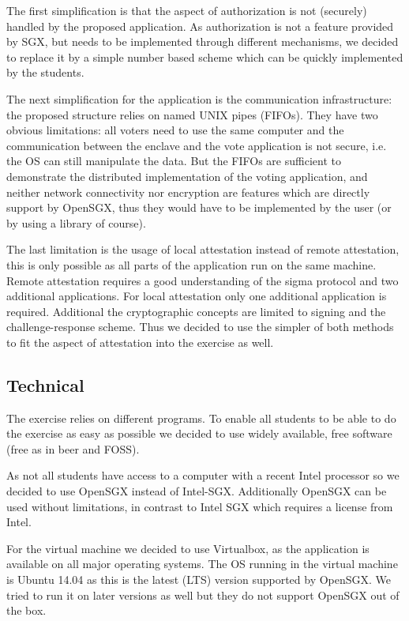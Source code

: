 \documentclass[DIN, pagenumber=false, fontsize=11pt, parskip=half]{scrartcl}
\begin{document}
    The first simplification is that the aspect of authorization is not (securely)
    handled by the proposed application. As authorization is not a feature provided
    by SGX, but needs to be implemented through different mechanisms, we decided
    to replace it by a simple number based scheme which can be quickly implemented
    by the students.

    The next simplification for the application is the communication infrastructure:
    the proposed structure relies on named UNIX pipes (FIFOs). They have two obvious
    limitations: all voters need to use the same computer and the communication
    between the enclave and the vote application is not secure, i.e. the OS can
    still manipulate the data. But the FIFOs are sufficient to demonstrate the distributed
    implementation of the voting application, and neither network connectivity nor
    encryption are features which are directly support by OpenSGX, thus they would have
    to be implemented by the user (or by using a library of course).

    The last limitation is the usage of local attestation instead of remote attestation,
    this is only possible as all parts of the application run on the same machine.
    Remote attestation requires a good understanding of the sigma protocol and two 
    additional applications. For local attestation only one additional application
    is required. Additional the cryptographic concepts are limited to signing and
    the challenge-response scheme. Thus we decided to use the simpler of both methods
    to fit the aspect of attestation into the exercise as well.

    \subsection{Technical}
    The exercise relies on different programs. To enable all students to be able
    to do the exercise as easy as possible we decided to use widely available,
    free software (free as in beer and FOSS).

    As not all students have access to a computer with a recent Intel processor so
    we decided to use OpenSGX instead of Intel-SGX. Additionally OpenSGX can be
    used without limitations, in contrast to Intel SGX which requires a license
    from Intel.
    
    For the virtual machine we decided to use Virtualbox, as the application is
    available on all major operating systems. The OS running in the virtual
    machine is Ubuntu 14.04 as this is the latest (LTS) version supported by
    OpenSGX. We tried to run it on later versions as well but they do not support
    OpenSGX out of the box.
\end{document}
